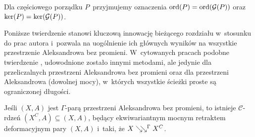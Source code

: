 Dla częściowego porządku $P$~przyjmujemy oznaczenia $\operatorname{ord}(P)=\operatorname{ord}(\mathcal{G}(P))$ oraz $\operatorname{ker}(P)=\operatorname{ker}(\mathcal{G}(P))$.

Poniższe twierdzenie stanowi kluczową innowację bieżącego rozdziału w~stosunku do prac autora \cite{Kukiela10a,Kukiela10} i~pozwala na uogólnienie ich głównych wyników na wszystkie przestrzenie Aleksandrowa bez promieni. W~cytowanych pracach podobne twierdzenie \cite[wniosek III.2.2]{Kukiela10a}, \cite[Proposition 4.4]{Kukiela10} udowodnione zostało innymi metodami, ale jedynie dla przeliczalnych przestrzeni Aleksandrowa bez promieni oraz dla przestrzeni Aleksandrowa (dowolnej mocy), w~których wszystkie ścieżki proste są ograniczonej długości.

\begin{tw}\label{mocny_retrakt}
Jeśli $(X,A)$ jest $\Gamma$-parą przestrzeni Aleksandrowa bez promieni, to istnieje $\mathcal{C}$-rdzeń $(X^C,A)\subseteq (X,A)$, będący ekwiwariantnym mocnym retraktem deformacyjnym pary $(X,A)$ i~taki, że $X\searrow\!\!\searrow^\Gamma X^C$.
\end{tw}
